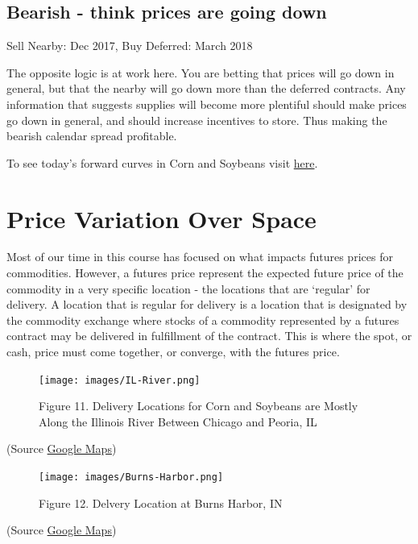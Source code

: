 \documentclass[
]{book}
\begin{document}
\hypertarget{bearish---think-prices-are-going-down}{%
\subsection{Bearish - think prices are going down}\label{bearish---think-prices-are-going-down}}

Sell Nearby: Dec 2017, Buy Deferred: March 2018

The opposite logic is at work here. You are betting that prices will go down in general, but that the nearby will go down more than the deferred contracts. Any information that suggests supplies will become more plentiful should make prices go down in general, and should increase incentives to store. Thus making the bearish calendar spread profitable.

To see today's forward curves in Corn and Soybeans visit \href{https://mindymallory.shinyapps.io/ForwardCurves/}{here}.

\hypertarget{price-variation-over-space}{%
\section{Price Variation Over Space}\label{price-variation-over-space}}

Most of our time in this course has focused on what impacts futures prices for commodities. However, a futures price represent the expected future price of the commodity in a very specific location - the locations that are `regular' for delivery. A location that is regular for delivery is a location that is designated by the commodity exchange where stocks of a commodity represented by a futures contract may be delivered in fulfillment of the contract. This is where the spot, or cash, price must come together, or converge, with the futures price.

\begin{figure}
\centering
\texttt{[image: images/IL-River.png]}
\caption{Figure 11. Delivery Locations for Corn and Soybeans are Mostly Along the Illinois River Between Chicago and Peoria, IL}
\end{figure}

(Source \href{https://www.google.com/maps}{Google Maps})

\begin{figure}
\centering
\texttt{[image: images/Burns-Harbor.png]}
\caption{Figure 12. Delvery Location at Burns Harbor, IN}
\end{figure}

(Source \href{https://www.google.com/maps/place/Burns+Harbor,+IN/@41.740398,-87.7248706,10.5z/data=!4m5!3m4!1s0x8811bc3712ab828d:0x98301a46014d10b5!8m2!3d41.6258708!4d-87.1333676}{Google Maps})
\end{document}
